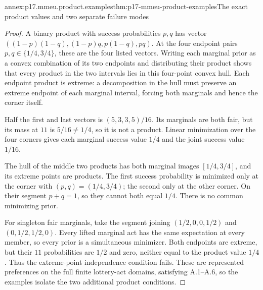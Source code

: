 \begin{annexitem}{annex:p17.mmeu.product.examples}{thm:p17-mmeu-product-examples}{The exact product values and two separate failure modes}
\begin{proof}
A binary product with success
probabilities \(p,q\) has vector
\(((1-p)(1-q),(1-p)q,p(1-q),pq)\).
At the four endpoint pairs
\(p,q\in\{1/4,3/4\}\), these
are the four listed vectors.
Writing each marginal prior as
a convex combination of its
two endpoints and distributing
their product shows that every
product in the two intervals
lies in this four-point convex
hull. Each endpoint product
is extreme: a decomposition
in the hull must preserve an
extreme endpoint of each marginal
interval, forcing both marginals
and hence the corner itself.

Half the first and last vectors
is \((5,3,3,5)/16\).
Its marginals are both fair,
but its mass at \(11\) is
\(5/16\ne1/4\), so it is
not a product. Linear minimization
over the four corners gives
each marginal success value
\(1/4\) and the joint success
value \(1/16\).

The hull of the middle two
products has both marginal
images \([1/4,3/4]\), and
its extreme points are products.
The first success probability
is minimized only at the
corner with \((p,q)=(1/4,3/4)\);
the second only at the other
corner. On their segment
\(p+q=1\), so they cannot
both equal \(1/4\). There is
no common minimizing prior.

For singleton fair marginals,
take the segment joining
\((1/2,0,0,1/2)\) and
\((0,1/2,1/2,0)\).
Every lifted marginal act
has the same expectation at
every member, so every prior
is a simultaneous minimizer.
Both endpoints are extreme,
but their \(11\) probabilities
are \(1/2\) and zero, neither
equal to the product value
\(1/4\). Thus the extreme-point
independence condition fails.
These are represented preferences
on the full finite lottery-act
domains, satisfying A.1--A.6,
so the examples isolate the two
additional product conditions.
\end{proof}
\end{annexitem}
